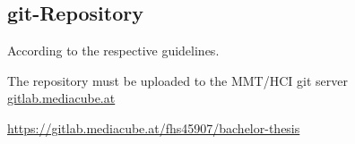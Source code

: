 \begin{appendices}

\section{git-Repository}

According to the respective guidelines.

The repository must be uploaded to the MMT/HCI git server {\url{gitlab.mediacube.at}}

{\color{red}\url{https://gitlab.mediacube.at/fhs45907/bachelor-thesis}}
	

\end{appendices}
